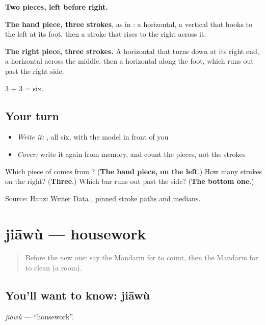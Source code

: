 \begin{quote}
\end{quote}

\textbf{Two pieces, left before right.}

\textbf{The hand piece, three strokes}, as in : a horizontal, a vertical that hooks to the left at its foot, then a stroke that rises to the right across it.

\textbf{The right piece, three strokes.} A horizontal that turns down at its right end, a horizontal across the middle, then a horizontal along the foot, which runs out past the right side.

3 + 3 = six.

\subsection*{Your turn}
\begin{itemize}
\raggedright
  \item \emph{Write it:} , all six, with the model in front of you
  \item \emph{Cover:} write it again from memory, and count the pieces, not the strokes
\end{itemize}

\begin{tcolorbox}[breakable,colback=teal!4,colframe=teal!35!black,title={Before you move on}]
Which piece of  comes from ? (\textbf{The hand piece, on the left}.) How many strokes on the right? (\textbf{Three}.) Which bar runs out past the side? (\textbf{The bottom one}.)

Source: \href{https://raw.githubusercontent.com/chanind/hanzi-writer-data/68d10a4b21150cae5e1ebbd223eed289cf32d90c/data/\%E6\%89\%AB.json}{Hanzi Writer Data , pinned stroke paths and medians}.
\end{tcolorbox}
\section[jiāwù]{jiāwù — housework}

\label{lesson:ZH-C133-jiawu}



\begin{quote}
Before the new one: say the Mandarin for to count, then the Mandarin for to clean (a room).
\end{quote}

\subsection*{You'll want to know: jiāwù}
\emph{jiāwù} — \textquotedblleft{}housework\textquotedblright{}.

